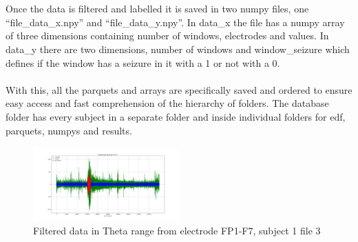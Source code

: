 \\\\
Once the data is filtered and labelled it is saved in two numpy files, one “file\_data\_x.npy” and “file\_data\_y.npy”. In data\_x the file has a numpy array of three dimensions containing number of windows, electrodes and values. In data\_y there are two dimensions, number of windows and window\_seizure which defines if the window has a seizure in it with a 1 or not with a 0. 
\\\\
With this, all the parquets and arrays are specifically saved and ordered to ensure easy access and fast comprehension of the hierarchy of folders. The database folder has every subject in a separate folder and inside individual folders for edf, parquets, numpys and results.
\\
\begin{figure}[h!]
    \caption{Filtered data in Theta range from electrode FP1-F7, subject 1 file 3}
    \centering
    \includegraphics[width=0.5\textwidth]{img/all in one.png}
\end{figure}

\leavevmode\\



